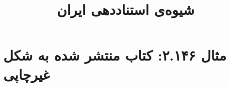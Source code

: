 \documentclass[a4paper,10pt]{article}
\begin{document}
\title{شیوه‌ی استناددهی ایران
 }
\author{}
\date{}
\maketitle



\section*{مثال ۲.۱۴۶: کتاب منتشر شده به شکل غیرچاپی}

\cite{سنگری1381}\\
\cite{hicks1996}\\






\end{document}
